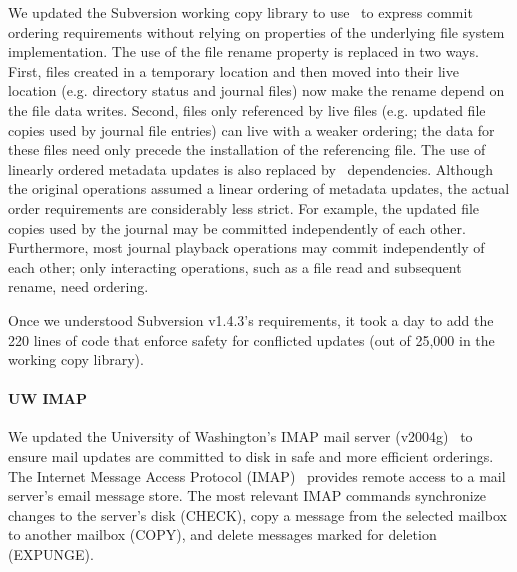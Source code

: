 We updated the Subversion working copy library to use \patchgroups\ to
express commit ordering requirements
without relying on properties of the
underlying file system implementation.
%
The use of the file rename property is replaced in two ways.
%
First, files created in a temporary location and then moved into their
live location (e.g. directory status and journal files) now
make the rename depend on the file data writes.
%
Second, files only referenced by live files (e.g. updated file
copies used by journal file entries) can live with a weaker ordering;
the data for these files need only precede the installation of the
referencing file.
%
The use of linearly ordered metadata updates is also replaced by
\patchgroup\ dependencies.
%
Although the original operations assumed a linear ordering of metadata
updates, the actual order requirements are considerably less strict.
%
For example, the updated file copies used by the journal may be
committed independently of each other.
%
Furthermore, most journal playback operations may commit
independently of each other; only interacting operations, such as a
file read and subsequent rename, need ordering.

Once we understood Subversion v1.4.3's requirements, it took a day to add
the 220 lines of code that enforce safety for conflicted updates (out of
25,000 in the working copy library).

\paragraph{UW IMAP}
\label{sec:patchgroup:uwimap}

We updated the University of Washington's IMAP mail server
(v2004g)~\cite{uwimap} to ensure mail updates are committed to disk
in safe and more efficient orderings.
%
The Internet Message Access Protocol (IMAP)~\cite{rfc3501} provides
remote access to a mail server's email message store.
%
The most relevant IMAP commands synchronize changes to the server's
disk (CHECK), copy a message from the selected mailbox to another
mailbox (COPY), and delete messages marked for deletion (EXPUNGE).

